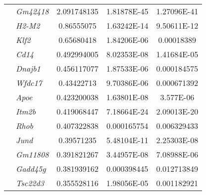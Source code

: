 \begin{table}[ht!]
\begin{tabularx}{\textwidth}{xxCCC}
       & \textit{Gm42418} &	2.091748135 &	\num{1.81878E-45} & \num{1.27096E-41}	 \\
     & \textit{H2-M2} &	0.86555075 &	\num{1.63242E-14} &	\num{9.50611E-12} \\
     & \textit{Klf2} &	0.65680418 & \num{1.84206E-06} &	0.00018389 \\
     & \textit{Cd14} &	0.492994005 & \num{8.02353E-08} & \num{1.41684E-05}		 \\
     & \textit{Dnajb1} &	0.456117077 & 	\num{1.87533E-06} &	0.000184575	 \\
     & \textit{Wfdc17} & 0.43422713 &	\num{9.70386E-06} &	0.000671392 \\
     & \textit{Apoe} &	0.423200038 &	\num{1.63801E-08} &	\num{3.577E-06} \\
     & \textit{Itm2b} &	0.419068447 & \num{7.18664E-24} & \num{2.09013E-20}	 \\
     & \textit{Rhob} &	0.407322838 & 0.000165754 & 0.006329433 \\
     & \textit{Jund} &	0.39571235 & \num{5.48104E-11} & \num{2.25303E-08}	 \\
     & \textit{Gm11808} &	0.391821267 & \num{3.44957E-08} & \num{7.08988E-06}	 \\
     & \textit{Gadd45g} &	0.381939162 & 0.000398445 & 0.012713849 \\
     & \textit{Tsc22d3} &0.355528116 & \num{1.98056E-05} & 0.001182921 \\
     \bottomrule
  \end{tabularx}
  \vspace{0.1cm}
\end{table}

\clearpage

